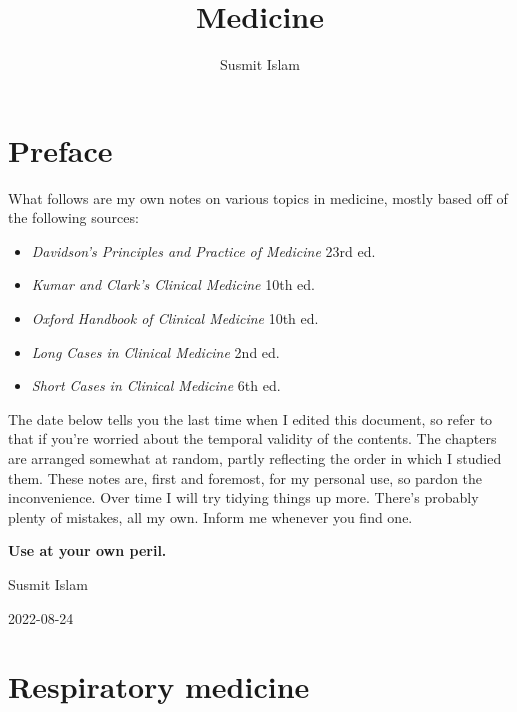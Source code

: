 \documentclass[
  12pt,
]{memoir}
\title{Medicine}
\author{Susmit Islam}
\date{}
\providecommand{\tightlist}{%
  \setlength{\itemsep}{0pt}\setlength{\parskip}{0pt}}
\begin{document}
\frontmatter

\maketitle

\mainmatter
\renewcommand{\labelitemi}{$\blacktriangleright$}
\renewcommand{\labelitemii}{$\boldsymbol\circ$}
\renewcommand{\labelitemiii}{$\bullet$}
\renewcommand{\labelitemiv}{\tiny$\blacksquare$}

\openany
\raggedbottom
\twocoltocetc
\tableofcontents

\pagebreak

\hypertarget{preface}{%
\chapter*{Preface}\label{preface}}

What follows are my own notes on various topics in medicine, mostly
based off of the following sources:

\begin{itemize}
\tightlist
\item
  \emph{Davidson's Principles and Practice of Medicine} 23rd ed.
\item
  \emph{Kumar and Clark's Clinical Medicine} 10th ed.
\item
  \emph{Oxford Handbook of Clinical Medicine} 10th ed.
\item
  \emph{Long Cases in Clinical Medicine} 2nd ed.
\item
  \emph{Short Cases in Clinical Medicine} 6th ed.
\end{itemize}

The date below tells you the last time when I edited this document, so
refer to that if you're worried about the temporal validity of the
contents. The chapters are arranged somewhat at random, partly
reflecting the order in which I studied them. These notes are, first and
foremost, for my personal use, so pardon the inconvenience. Over time I
will try tidying things up more. There's probably plenty of mistakes,
all my own. Inform me whenever you find one.\newline

\textbf{Use at your own peril.}

\hfill Susmit Islam

\hfill 2022-08-24

\hypertarget{respiratory-medicine}{%
\chapter{Respiratory medicine}\label{respiratory-medicine}}
\end{document}

